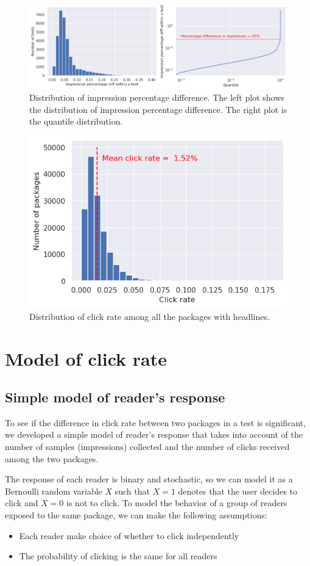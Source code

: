 \documentclass[%
preprint,
 amsmath,amssymb,
 aps,
]{revtex4-2}
\begin{document}
\begin{figure}
    \centering
    \includegraphics[width=\linewidth]{fig/stat2_package_impression_imbalance.png}
    \caption{Distribution of impression percentage difference. The left plot shows the distribution of impression percentage difference. The right plot is the quantile distribution. }
    \label{fig:stat2_package_imbalance}
\end{figure}

\begin{figure}
    \centering
    \includegraphics[width=0.5\linewidth]{fig/stat3_click_rate_hist.png}
    \caption{Distribution of click rate among all the packages with headlines.}
    \label{fig:stat3_click_rate}
\end{figure}

\section{Model of click rate}

\subsection{Simple model of reader's response}

To see if the difference in click rate between two packages in a test is significant, we developed a simple model of reader's response that takes into account of the number of samples (impressions) collected and the number of clicks received among the two packages.

The response of each reader is binary and stochastic, so we can model it as a Bernoulli random variable $X$ such that $X=1$ denotes that the user decides to click and $X=0$ is not to click.
To model the behavior of a group of readers exposed to the same package, we can make the following assumptions:
\begin{itemize}
    \item Each reader make choice of whether to click independently
    \item The probability of clicking is the same for all readers
\end{itemize}
\end{document}

